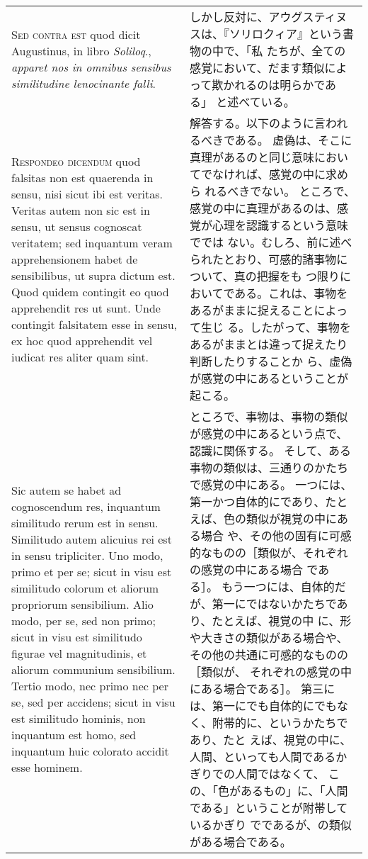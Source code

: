 \documentclass[10pt]{jsarticle} %
\begin{document}
\begin{longtable}{p{21em}p{21em}}
{\scshape  Sed contra est} quod dicit Augustinus, in libro {\itshape Soliloq}.,
{\itshape apparet nos in omnibus sensibus similitudine lenocinante falli}.


&
しかし反対に、アウグスティヌスは、『ソリロクィア』という書物の中で、「私
 たちが、全ての感覚において、だます類似によって欺かれるのは明らかである」
 と述べている。

\\


{\scshape Respondeo dicendum} quod falsitas non est quaerenda in sensu,
nisi sicut ibi est veritas. Veritas autem non sic est in sensu, ut
sensus cognoscat veritatem; sed inquantum veram apprehensionem habet de
sensibilibus, ut supra dictum est. Quod quidem contingit eo quod
apprehendit res ut sunt. Unde contingit falsitatem esse in sensu, ex hoc
quod apprehendit vel iudicat res aliter quam sint. 

&

解答する。以下のように言われるべきである。
虚偽は、そこに真理があるのと同じ意味においてでなければ、感覚の中に求めら
 れるべきでない。
ところで、感覚の中に真理があるのは、感覚が心理を認識するという意味ででは
 ない。むしろ、前に述べられたとおり、可感的諸事物について、真の把握をも
 つ限りにおいてである。これは、事物をあるがままに捉えることによって生じ
 る。したがって、事物をあるがままとは違って捉えたり判断したりすることか
 ら、虚偽が感覚の中にあるということが起こる。

\\



Sic autem se habet ad
cognoscendum res, inquantum similitudo rerum est in sensu. Similitudo
autem alicuius rei est in sensu tripliciter. Uno modo, primo et per se;
sicut in visu est similitudo colorum et aliorum propriorum
sensibilium. Alio modo, per se, sed non primo; sicut in visu est
similitudo figurae vel magnitudinis, et aliorum communium
sensibilium. Tertio modo, nec primo nec per se, sed per accidens; sicut
in visu est similitudo hominis, non inquantum est homo, sed inquantum
huic colorato accidit esse hominem. 

&

ところで、事物は、事物の類似が感覚の中にあるという点で、認識に関係する。
 そして、ある事物の類似は、三通りのかたちで感覚の中にある。
一つには、第一かつ自体的にであり、たとえば、色の類似が視覚の中にある場合
 や、その他の固有に可感的なものの［類似が、それぞれの感覚の中にある場合
 である］。
もう一つには、自体的だが、第一にではないかたちであり、たとえば、視覚の中
 に、形や大きさの類似がある場合や、その他の共通に可感的なものの［類似が、
 それぞれの感覚の中にある場合である］。
第三には、第一にでも自体的にでもなく、附帯的に、というかたちであり、たと
 えば、視覚の中に、人間、といっても人間であるかぎりでの人間ではなくて、
 この、「色があるもの」に、「人間である」ということが附帯しているかぎり
 でであるが、の類似がある場合である。



\end{longtable}
\end{document}
